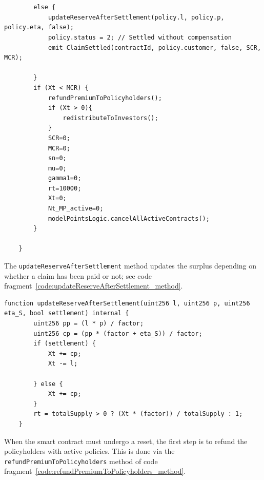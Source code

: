 \documentclass[10pt]{article}
\begin{document}
\begin{codefragment}[!h]
\begin{lstlisting}[language=Solidity]


        else {
            updateReserveAfterSettlement(policy.l, policy.p, policy.eta, false);
            policy.status = 2; // Settled without compensation
            emit ClaimSettled(contractId, policy.customer, false, SCR, MCR);
            
        }    
        if (Xt < MCR) {
            refundPremiumToPolicyholders();
            if (Xt > 0){
                redistributeToInvestors();
            }
            SCR=0;
            MCR=0;
            sn=0;
            mu=0;
            gamma1=0;
            rt=10000;
            Xt=0;
            Nt_MP_active=0;
            modelPointsLogic.cancelAllActiveContracts();
        }
        
    }
        \end{lstlisting}
\caption{Part 2 of \texttt{settle} method of \texttt{InsuranceLogic}}
    \label{code:settle_method_2}
\end{codefragment}

The \texttt{updateReserveAfterSettlement} method updates the surplus depending on whether a claim has been paid or not; see code fragment~\ref{code:updateReserveAfterSettlement_method}.


\begin{codefragment}[!h]
\begin{lstlisting}[language=Solidity]
function updateReserveAfterSettlement(uint256 l, uint256 p, uint256 eta_S, bool settlement) internal {
        uint256 pp = (l * p) / factor;
        uint256 cp = (pp * (factor + eta_S)) / factor;
        if (settlement) {
            Xt += cp;
            Xt -= l;

        } else {
            Xt += cp;
        }
        rt = totalSupply > 0 ? (Xt * (factor)) / totalSupply : 1;
    }
            \end{lstlisting}
\caption{\texttt{updateReserveAfterSettlement} method of \texttt{InsuranceLogic}}
    \label{code:updateReserveAfterSettlement_method}
\end{codefragment}

When the smart contract must undergo a reset, the first step is to refund the policyholders with active policies. This is done via the \texttt{refundPremiumToPolicyholders} method of code fragment~\ref{code:refundPremiumToPolicyholders_method}.
\end{document}
